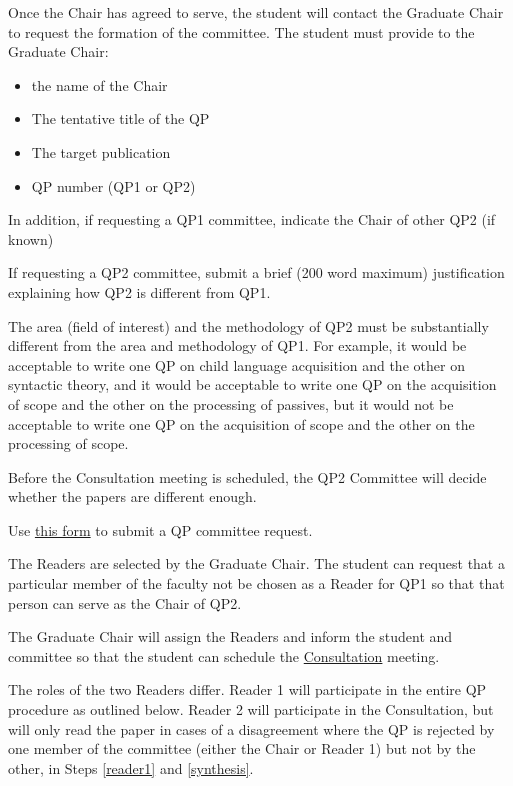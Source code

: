 \documentclass[
]{book}
\providecommand{\tightlist}{%
  \setlength{\itemsep}{0pt}\setlength{\parskip}{0pt}}
\begin{document}
Once the Chair has agreed to serve, the student will contact the Graduate Chair to request the formation of the committee. The student must provide to the Graduate Chair:

\begin{itemize}
\tightlist
\item
  the name of the Chair
\item
  The tentative title of the QP
\item
  The target publication
\item
  QP number (QP1 or QP2)
\end{itemize}

In addition, if requesting a QP1 committee, indicate the Chair of other QP2 (if known)

If requesting a QP2 committee, submit a brief (200 word maximum) justification explaining how QP2 is different from QP1.

The area (field of interest) and the methodology of QP2 must be substantially different from the area and methodology of QP1. For example, it would be acceptable to write one QP on child language acquisition and the other on syntactic theory, and it would be acceptable to write one QP on the acquisition of scope and the other on the processing of passives, but it would not be acceptable to write one QP on the acquisition of scope and the other on the processing of scope.

Before the Consultation meeting is scheduled, the QP2 Committee will decide whether the papers are different enough.

Use \href{https://forms.gle/YNipJTdAiRSxnrHU8}{this form} to submit a QP committee request.

The Readers are selected by the Graduate Chair. The student can request that a particular member of the faculty not be chosen as a Reader for QP1 so that that person can serve as the Chair of QP2.

The Graduate Chair will assign the Readers and inform the student and committee so that the student can schedule the \hyperref[consultation]{Consultation} meeting.

The roles of the two Readers differ. Reader 1 will participate in the entire QP procedure as outlined below. Reader 2 will participate in the Consultation, but will only read the paper in cases of a disagreement where the QP is rejected by one member of the committee (either the Chair or Reader 1) but not by the other, in Steps \ref{reader1} and \ref{synthesis}.
\end{document}
